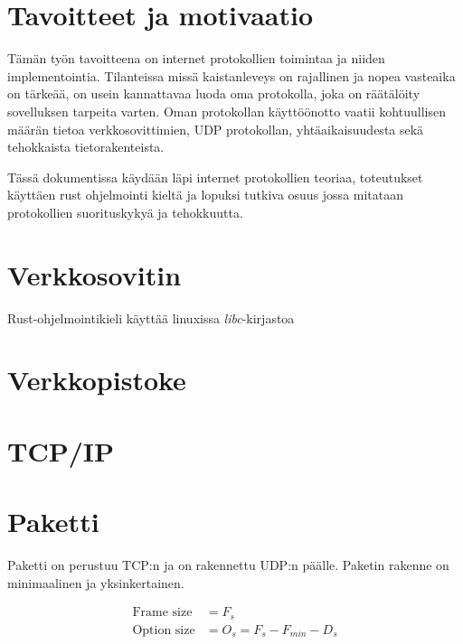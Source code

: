 \documentclass[a4paper,12pt]{article}
\begin{document}
    \section{Tavoitteet ja motivaatio}
    Tämän työn tavoitteena on internet protokollien toimintaa ja niiden implementointia. Tilanteissa missä kaistanleveys on rajallinen ja nopea vasteaika on tärkeää, on usein kannattavaa luoda oma protokolla, joka on räätälöity sovelluksen tarpeita varten.
Oman protokollan käyttöönotto vaatii kohtuullisen määrän tietoa verkkosovittimien, UDP protokollan, yhtäaikaisuudesta sekä tehokkaista tietorakenteista.\par
    Tässä dokumentissa käydään läpi internet protokollien teoriaa, toteutukset käyttäen rust ohjelmointi kieltä ja lopuksi tutkiva osuus jossa mitataan protokollien suorituskykyä ja tehokkuutta.


    \section{Verkkosovitin}\label{sec:verkkosovitin}
    Rust-ohjelmointikieli käyttää linuxissa \textit{libc}-kirjastoa \cite{rust-source-unix-netrs}

    \section{Verkkopistoke}\label{sec:verkkopistoke}
    \blindtext


    \section{TCP/IP}\label{sec:tcpip}
    \blindtext

    \section{Paketti}\label{sec:paketti}
    Paketti on perustuu TCP:n ja on rakennettu UDP:n päälle. Paketin rakenne on minimaalinen ja yksinkertainen.

\begin{align}
    \text{Frame size} &= F_s \\
    \text{Option size} &= O_s = F_s - F_{min} - D_s
\end{align}
\end{document}

